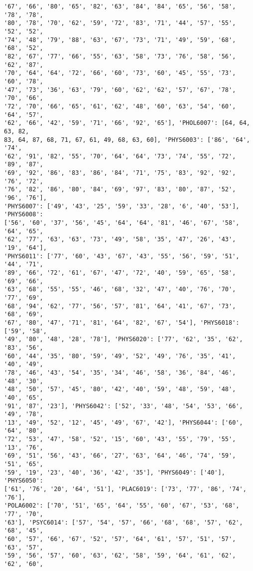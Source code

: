 \documentclass[11pt]{article}
\begin{document}
\begin{Verbatim}[commandchars=\\\{\}]
'67', '66', '80', '65', '82', '63', '84', '84', '65', '56', '58', '78', '78',
'80', '78', '70', '62', '59', '72', '83', '71', '44', '57', '55', '52', '52',
'74', '48', '79', '88', '63', '67', '73', '71', '49', '59', '68', '68', '52',
'82', '67', '77', '66', '55', '63', '58', '73', '76', '58', '56', '62', '87',
'70', '64', '64', '72', '66', '60', '73', '60', '45', '55', '73', '60', '78',
'47', '73', '36', '63', '79', '60', '62', '62', '57', '67', '78', '70', '66',
'72', '70', '66', '65', '61', '62', '48', '60', '63', '54', '60', '64', '57',
'62', '66', '42', '59', '71', '66', '92', '65'], 'PHOL6007': [64, 64, 63, 82,
83, 64, 87, 68, 71, 67, 61, 49, 68, 63, 60], 'PHYS6003': ['86', '64', '74',
'62', '91', '82', '55', '70', '64', '64', '73', '74', '55', '72', '89', '87',
'69', '92', '86', '83', '86', '84', '71', '75', '83', '92', '92', '76', '72',
'76', '82', '86', '80', '84', '69', '97', '83', '80', '87', '52', '96', '76'],
'PHYS6007': ['49', '43', '25', '59', '33', '28', '6', '40', '53'], 'PHYS6008':
['56', '60', '37', '56', '45', '64', '64', '81', '46', '67', '58', '64', '65',
'62', '77', '63', '63', '73', '49', '58', '35', '47', '26', '43', '19', '64'],
'PHYS6011': ['77', '60', '43', '67', '43', '55', '56', '59', '51', '44', '71',
'89', '66', '72', '61', '67', '47', '72', '40', '59', '65', '58', '69', '66',
'63', '68', '55', '55', '46', '68', '32', '47', '40', '76', '70', '77', '69',
'68', '94', '62', '77', '56', '57', '81', '64', '41', '67', '73', '68', '69',
'67', '80', '47', '71', '81', '64', '82', '67', '54'], 'PHYS6018': ['59', '58',
'49', '80', '48', '28', '78'], 'PHYS6020': ['77', '62', '35', '62', '83', '56',
'60', '44', '35', '80', '59', '49', '52', '49', '76', '35', '41', '40', '49',
'78', '46', '43', '54', '35', '34', '46', '58', '36', '84', '46', '48', '30',
'48', '50', '57', '45', '80', '42', '40', '59', '48', '59', '48', '40', '65',
'91', '87', '23'], 'PHYS6042': ['52', '33', '48', '54', '53', '66', '49', '78',
'13', '49', '52', '12', '45', '49', '67', '42'], 'PHYS6044': ['60', '64', '80',
'72', '53', '47', '58', '52', '15', '60', '43', '55', '79', '55', '13', '76',
'69', '51', '56', '43', '66', '27', '63', '64', '46', '74', '59', '51', '65',
'59', '19', '23', '40', '36', '42', '35'], 'PHYS6049': ['40'], 'PHYS6050':
['61', '76', '20', '64', '51'], 'PLAC6019': ['73', '77', '86', '74', '76'],
'POLA6002': ['70', '51', '65', '64', '55', '60', '67', '53', '68', '77', '70',
'63'], 'PSYC6014': ['57', '54', '57', '66', '68', '68', '57', '62', '68', '45',
'60', '57', '66', '67', '52', '57', '64', '61', '57', '51', '57', '63', '57',
'59', '56', '57', '60', '63', '62', '58', '59', '64', '61', '62', '62', '60',

\end{Verbatim}
\end{document}
